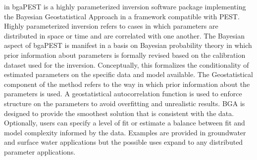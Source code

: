 \documentclass[11pt,oneside,onecolumn]{usgsreport}
\begin{document}

\setlength{\hfuzz}{12pt}
\makefrontmatter
\onecolumn
\setlength{\hfuzz}{0.1pt}

\pagestyle{body}

\begin{multicols}{2}
\begin{bibunit}

\raggedcolumns
\raggedright
{}
 in
bgaPEST is a highly parameterized inversion software package implementing
the Bayesian Geostatistical Approach in a framework compatible with
PEST. Highly parameterized inversion refers to cases in which parameters
are distributed in space or time and are correlated with one another.
The Bayesian aspect of bgaPEST is manifest in a basis on Bayesian
probability theory in which prior information about parameters is
formally revised based on the calibration dataset used for the inversion.
Conceptually, this formalizes the conditionality of estimated parameters
on the specific data and model available. The Geostatistical component
of the method refers to the way in which prior information about the
parameters is used. A geostatistical autocorrelation function is used
to enforce structure on the parameters to avoid overfitting and unrealistic
results. BGA is designed to provide the smoothest solution that is
consistent with the data. Optionally, users can specify a level of
fit or estimate a balance between fit and model complexity informed
by the data. Examples are provided in groundwater and surface water
applications but the possible uses expand to any distributed parameter
applications. 




\end{bibunit}
\end{multicols}
\end{document}
